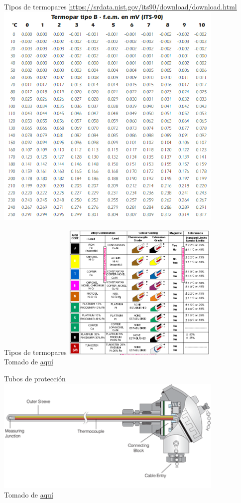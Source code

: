 \documentclass[aspectratio=169]{beamer}
\begin{document}
\begin{frame}{Tipos de termopares \tiny{\href{https://srdata.nist.gov/its90/download/download.html}{https://srdata.nist.gov/its90/download/download.html}}}
\centering
    \includegraphics[width=11cm]{fig/ITS-90.PNG}
\end{frame}
\begin{frame}{Tipos de termopares}
\centering
    \includegraphics[width=7.5cm]{fig/thermometricscorp.png}
    \\ \tiny{Tomado de \href{https://www.thermometricscorp.com/thermocouple-color-code.html}{aquí}}
\end{frame}
\begin{frame}{Tubos de protección}
\centering
    \includegraphics[width=11cm]{fig/thermocouple-probe-head.png}
    \\ \tiny{Tomado de \href{https://www.tcaus.com.au/thermocouple/index.html}{aquí}}
\end{frame}
\end{document}
